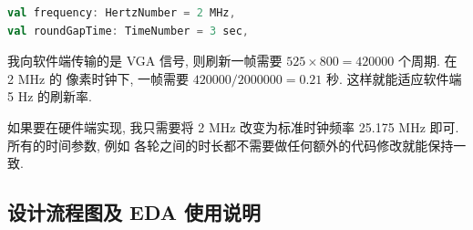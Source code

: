 \begin{lstlisting}[caption={SpinalHDL 中的时间参数}, label={code:spinaltime}, language=scala]
val frequency: HertzNumber = 2 MHz,
val roundGapTime: TimeNumber = 3 sec,
\end{lstlisting}

我向软件端传输的是 VGA 信号, 则刷新一帧需要 $525 \times 800 = 420000$ 个周期. 在 2 MHz 的
像素时钟下, 一帧需要 $420000 / 2000000 = 0.21$ 秒. 这样就能适应软件端 5 Hz 的刷新率.

如果要在硬件端实现, 我只需要将 2 MHz 改变为标准时钟频率 25.175 MHz 即可. 所有的时间参数, 例如
各轮之间的时长都不需要做任何额外的代码修改就能保持一致. 

\subsection{设计流程图及 EDA 使用说明}
